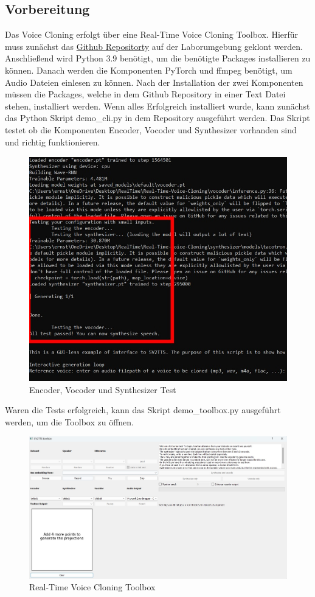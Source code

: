 \subsection{Vorbereitung}
Das Voice Cloning erfolgt über eine Real-Time Voice Cloning Toolbox. Hierfür muss zunächst das \href{https://github.com/CorentinJ/Real-Time-Voice-Cloning}{Github Repositorty} auf der Laborumgebung geklont werden. Anschließend wird Python 3.9 benötigt, um die benötigte Packages installieren zu können. Danach werden die Komponenten PyTorch und ffmpeg benötigt, um Audio Dateien einlesen zu können. Nach der Installation der zwei Komponenten müssen die Packages, welche in dem Github Repository in einer Text Datei stehen, installiert werden. Wenn alles Erfolgreich installiert wurde, kann zunächst das Python Skript demo\_cli.py in dem Repository ausgeführt werden. Das Skript testet ob die Komponenten Encoder, Vocoder und Synthesizer vorhanden sind und richtig funktionieren.
\begin{figure}[H]
    \includegraphics[width=1.0\textwidth]{Bilder/ToolboxTest}
    \centering
    \caption{Encoder, Vocoder und Synthesizer Test}
    \label{fig:KomponentenTest}
\end{figure}
Waren die Tests erfolgreich, kann das Skript demo\_toolbox.py ausgeführt werden, um die Toolbox zu öffnen.
\begin{figure}[H]
    \includegraphics[width=1.0\textwidth]{Bilder/AudioToolbox1}
    \centering
    \caption{Real-Time Voice Cloning Toolbox}
    \label{fig:RTVCloningToolbox}
\end{figure}
